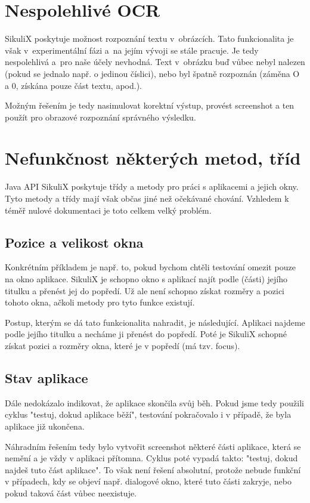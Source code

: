 	\section{Nespolehlivé OCR}
	SikuliX poskytuje možnost rozpoznání textu v~obrázcích. Tato funkcionalita je však v~experimentální fázi a~na jejím vývoji se stále pracuje. Je tedy nespolehlivá a~pro naše účely nevhodná. Text v~obrázku buď vůbec nebyl nalezen (pokud se jednalo např. o jedinou číslici), nebo byl špatně rozpoznán (záměna O a 0, získána pouze část textu, apod.).
	
	Možným řešením je tedy nasimulovat korektní výstup, provést screenshot a ten použít pro obrazové rozpoznání správného výsledku.
	
	\section{Nefunkčnost některých metod, tříd}
	Java API SikuliX poskytuje třídy a metody pro práci s aplikacemi a jejich okny. Tyto metody a třídy mají však občas jiné než očekávané chování. Vzhledem k téměř nulové dokumentaci je toto celkem velký problém.

		\subsection{Pozice a velikost okna}		
		Konkrétním příkladem je např. to, pokud bychom chtěli testování omezit pouze na okno aplikace. SikuliX je schopno okno s aplikací najít podle (části) jejího titulku a přenést jej do popředí. Už ale není schopno získat rozměry a pozici tohoto okna, ačkoli metody pro tyto funkce existují.
	
		Postup, kterým se dá tato funkcionalita nahradit, je následující. Aplikaci najdeme podle jejího titulku a necháme ji přenést do popředí. Poté je SikuliX schopné získat pozici a rozměry okna, které je v popředí (má tzv. focus).
		
		\subsection{Stav aplikace}
		Dále nedokázalo indikovat, že aplikace skončila svůj běh. Pokud jsme tedy použili cyklus "testuj, dokud aplikace běží", testování pokračovalo i v případě, že byla aplikace již ukončena.
	
		Náhradním řešením tedy bylo vytvořit screenshot některé části aplikace, která se nemění a je vždy v aplikaci přítomna. Cyklus poté vypadá takto: "testuj, dokud najdeš tuto část aplikace". To však není řešení absolutní, protože nebude funkční v případech, kdy se objeví např. dialogové okno, které tuto části zakryje, nebo pokud taková část vůbec neexistuje.
		
